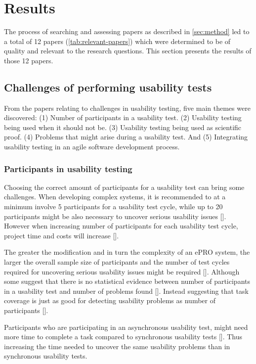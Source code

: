 \section{Results} \label{sec:results}
The process of searching and assessing papers as described in \autoref{sec:method} led to a total of 12 papers (\autoref{tab:relevant-papers}) which were determined to be of quality and relevant to the research questions. This section presents the results of those 12 papers.

\subsection{Challenges of performing usability tests}
From the papers relating to challenges in usability testing, five main themes were discovered: (1) Number of participants in a usability test. (2) Usability testing being used when it should not be. (3) Usability testing being used as scientific proof. (4) Problems that might arise during a usability test. And (5) Integrating usability testing in an agile software development process.

\subsubsection{Participants in usability testing} \label{sec:participants-in-usability-testing}
Choosing the correct amount of participants for a usability test can bring some challenges. When developing complex systems, it is recommended to at a minimum involve 5 participants for a usability test cycle, while up to 20 participants might be also necessary to uncover serious usability issues [\cite{ola_2019}]. However when increasing number of participants for each usability test cycle, project time and costs will increase [\cite{ola_2019}].

The greater the modification and in turn the complexity of an ePRO system, the larger the overall sample size of participants and the number of test cycles required for uncovering serious usability issues might be required [\cite{ola_2019}]. Although some suggest that there is no statistical evidence between number of participants in a usability test and number of problems found [\cite{gl_2007}]. Instead suggesting that task coverage is just as good for detecting usability problems as number of participants [\cite{gl_2007}].

Participants who are participating in an asynchronous usability test, might need more time to complete a task compared to synchronous usability tests [\cite{ola_2019}]. Thus increasing the time needed to uncover the same usability problems than in synchronous usability tests.

